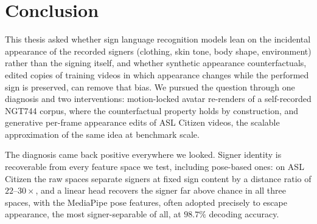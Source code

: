 \chapter{Conclusion}
This thesis asked whether sign language recognition models lean on the
incidental appearance of the recorded signers (clothing, skin tone,
body shape, environment) rather than the signing itself, and whether
synthetic appearance counterfactuals, edited copies of training videos in
which appearance changes while the performed sign is preserved, can
remove that bias. We pursued the question through one diagnosis and two
interventions: motion-locked avatar re-renders of a
self-recorded NGT744 corpus, where the counterfactual property holds by
construction, and generative per-frame appearance edits of ASL
Citizen videos, the scalable approximation of the same idea at benchmark
scale.

The diagnosis came back positive everywhere we looked. Signer identity is
recoverable from every feature space we test, including pose-based ones:
on ASL Citizen the raw spaces separate signers at fixed sign content by a
distance ratio of $22$--$30\times$, and a linear head recovers the signer
far above chance in all three spaces, with the MediaPipe pose features,
often adopted precisely to escape appearance, the most
signer-separable of all, at $98.7\%$ decoding accuracy.

